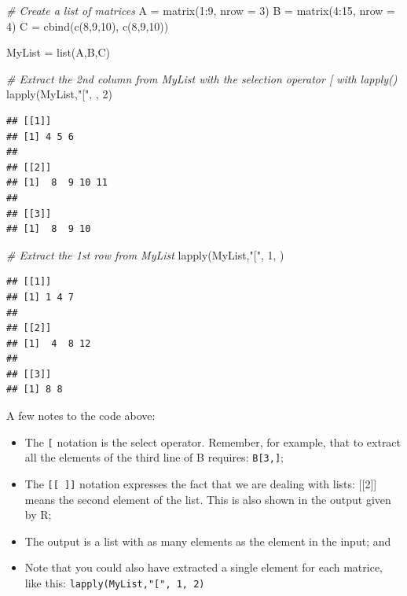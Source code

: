 \documentclass[
]{book}
\newenvironment{Shaded}{\begin{snugshade}}{\end{snugshade}}
\newcommand{\AttributeTok}[1]{\textcolor[rgb]{0.77,0.63,0.00}{#1}}
\newcommand{\CommentTok}[1]{\textcolor[rgb]{0.56,0.35,0.01}{\textit{#1}}}
\newcommand{\DecValTok}[1]{\textcolor[rgb]{0.00,0.00,0.81}{#1}}
\newcommand{\FunctionTok}[1]{\textcolor[rgb]{0.00,0.00,0.00}{#1}}
\newcommand{\NormalTok}[1]{#1}
\newcommand{\OtherTok}[1]{\textcolor[rgb]{0.56,0.35,0.01}{#1}}
\newcommand{\SpecialCharTok}[1]{\textcolor[rgb]{0.00,0.00,0.00}{#1}}
\newcommand{\StringTok}[1]{\textcolor[rgb]{0.31,0.60,0.02}{#1}}
\providecommand{\tightlist}{%
  \setlength{\itemsep}{0pt}\setlength{\parskip}{0pt}}
\theoremstyle{definition}
\theoremstyle{definition}
\theoremstyle{definition}
\theoremstyle{definition}
\theoremstyle{remark}
\begin{document}
\begin{Shaded}
\begin{Highlighting}[]
\CommentTok{\# Create a list of matrices}
\NormalTok{A }\OtherTok{=} \FunctionTok{matrix}\NormalTok{(}\DecValTok{1}\SpecialCharTok{:}\DecValTok{9}\NormalTok{, }\AttributeTok{nrow =} \DecValTok{3}\NormalTok{)}
\NormalTok{B }\OtherTok{=} \FunctionTok{matrix}\NormalTok{(}\DecValTok{4}\SpecialCharTok{:}\DecValTok{15}\NormalTok{, }\AttributeTok{nrow =} \DecValTok{4}\NormalTok{)}
\NormalTok{C }\OtherTok{=} \FunctionTok{cbind}\NormalTok{(}\FunctionTok{c}\NormalTok{(}\DecValTok{8}\NormalTok{,}\DecValTok{9}\NormalTok{,}\DecValTok{10}\NormalTok{), }\FunctionTok{c}\NormalTok{(}\DecValTok{8}\NormalTok{,}\DecValTok{9}\NormalTok{,}\DecValTok{10}\NormalTok{))}

\NormalTok{MyList }\OtherTok{=} \FunctionTok{list}\NormalTok{(A,B,C)}

\CommentTok{\# Extract the 2nd column from \textasciigrave{}MyList\textasciigrave{} with the selection operator \textasciigrave{}[\textasciigrave{} with \textasciigrave{}lapply()\textasciigrave{}}
\FunctionTok{lapply}\NormalTok{(MyList,}\StringTok{"["}\NormalTok{, , }\DecValTok{2}\NormalTok{)}
\end{Highlighting}
\end{Shaded}

\begin{verbatim}
## [[1]]
## [1] 4 5 6
## 
## [[2]]
## [1]  8  9 10 11
## 
## [[3]]
## [1]  8  9 10
\end{verbatim}

\begin{Shaded}
\begin{Highlighting}[]
\CommentTok{\# Extract the 1st row from \textasciigrave{}MyList\textasciigrave{}}
\FunctionTok{lapply}\NormalTok{(MyList,}\StringTok{"["}\NormalTok{, }\DecValTok{1}\NormalTok{, )}
\end{Highlighting}
\end{Shaded}

\begin{verbatim}
## [[1]]
## [1] 1 4 7
## 
## [[2]]
## [1]  4  8 12
## 
## [[3]]
## [1] 8 8
\end{verbatim}

A few notes to the code above:

\begin{itemize}
\tightlist
\item
  The \texttt{{[}} notation is the select operator. Remember, for example, that to extract all the elements of the third line of B requires: \texttt{B{[}3,{]}};
\item
  The \texttt{{[}{[}\ {]}{]}} notation expresses the fact that we are dealing with lists: {[}{[}2{]}{]} means the second element of the list. This is also shown in the output given by R;
\item
  The output is a list with as many elements as the element in the input; and
\item
  Note that you could also have extracted a single element for each matrice, like this: \texttt{lapply(MyList,"{[}",\ 1,\ 2)}
\end{itemize}
\end{document}
